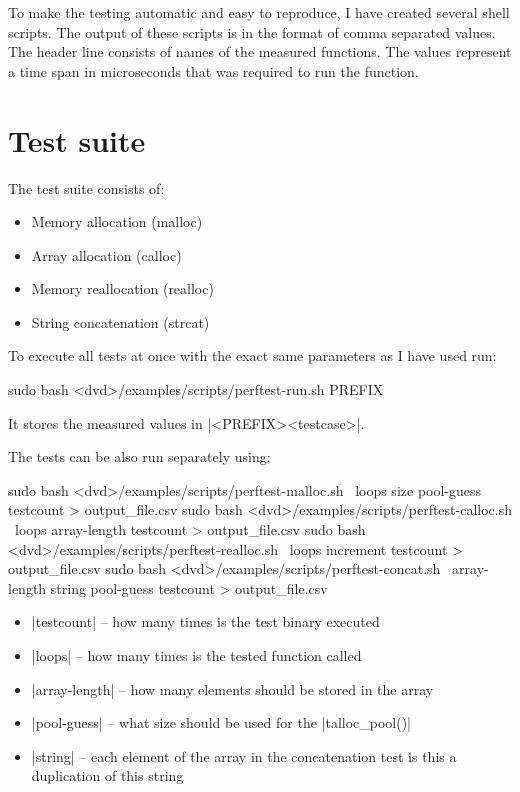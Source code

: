 \noindent
To make the testing automatic and easy to reproduce, I have created several
shell scripts. The output of these scripts is in the format of comma separated
values. The header line consists of names of the measured functions. The values
represent a time span in microseconds that was required to run the function.

\section{Test suite}

The test suite consists of:
\begin{itemize}
  \item Memory allocation (malloc)
  \item Array allocation (calloc)
  \item Memory reallocation (realloc)
  \item String concatenation (strcat)
\end{itemize}

\noindent
To execute all tests at once with the exact same parameters as I have used run:
\begin{commandline}
sudo bash <dvd>/examples/scripts/perftest-run.sh PREFIX
\end{commandline}
\funclistend
It stores the measured values in |<PREFIX><testcase>|.

\noindent
The tests can be also run separately using:
\begin{commandline}
sudo bash <dvd>/examples/scripts/perftest-malloc.sh
     \ loops size pool-guess testcount > output_file.csv
sudo bash <dvd>/examples/scripts/perftest-calloc.sh
     \ loops array-length testcount > output_file.csv
sudo bash <dvd>/examples/scripts/perftest-realloc.sh
     \ loops increment testcount > output_file.csv
sudo bash <dvd>/examples/scripts/perftest-concat.sh
     \ array-length string pool-guess testcount > output_file.csv
\end{commandline}
\begin{itemize}
  \item |testcount| -- how many times is the test binary executed
  \item |loops| -- how many times is the tested function called
  \item |array-length| -- how many elements should be stored in the array
  \item |pool-guess| -- what size should be used for the |talloc_pool()|
  \item |string| -- each element of the array in the concatenation test is this
  a duplication of this string
\end{itemize}

